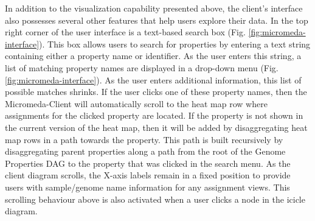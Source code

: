 In addition to the visualization capability presented above, the client's interface also possesses several other features that help users explore their data. In the top right corner of the user interface is a text-based search box (Fig. \ref{fig:micromeda-interface}). This box allows users to search for properties by entering a text string containing either a property name or identifier. As the user enters this string, a list of matching property names are displayed in a drop-down menu (Fig. \ref{fig:micromeda-interface}). As the user enters additional information, this list of possible matches shrinks. If the user clicks one of these property names, then the Micromeda-Client will automatically scroll to the heat map row where assignments for the clicked property are located. If the property is not shown in the current version of the heat map, then it will be added by disaggregating heat map rows in a path towards the property. This path is built recursively by disaggregating parent properties along a path from the root of the Genome Properties DAG to the property that was clicked in the search menu. As the client diagram scrolls, the X-axis labels remain in a fixed position to provide users with sample/genome name information for any assignment views. This scrolling behaviour above is also activated when a user clicks a node in the icicle diagram.

